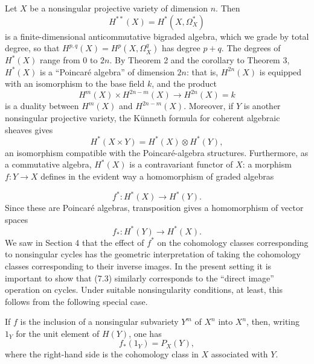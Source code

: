 
Let $X$ be a nonsingular projective variety of dimension $n$. Then
\[
  H^{**}(X)=H^{*}(X,\Omega_X^{*})
\]
is a finite-dimensional anticommutative bigraded algebra, which we grade by
total degree, so that $H^{p,q}(X)=H^{p}(X,\Omega_X^{q})$ has degree $p+q$. The
degrees of $H^{*}(X)$ range from $0$ to $2n$. By Theorem 2 and the corollary to
Theorem 3, $H^{*}(X)$ is a ``Poincaré algebra'' of dimension $2n$: that is,
$H^{2n}(X)$ is equipped with an isomorphism to the base field $k$, and the
product
\[
  H^{m}(X)\times H^{2n-m}(X)\longrightarrow H^{2n}(X)=k
\]
is a duality between $H^{m}(X)$ and $H^{2n-m}(X)$. Moreover, if $Y$ is another
nonsingular projective variety, the Künneth formula for coherent algebraic
sheaves gives
\begin{equation}\tag{7.1}
  H^{*}(X\times Y)=H^{*}(X)\otimes H^{*}(Y),
\end{equation}
an isomorphism compatible with the Poincaré-algebra structures. Furthermore,
as a commutative algebra, $H^{*}(X)$ is a contravariant functor of $X$: a
morphism $f:Y\longrightarrow X$ defines in the evident way a homomorphism of
graded algebras

\begin{equation}\tag{7.2}
  f^{*}:H^{*}(X)\longrightarrow H^{*}(Y).
\end{equation}
Since these are Poincaré algebras, transposition gives a homomorphism of vector
spaces
\begin{equation}\tag{7.3}
  f_{*}:H^{*}(Y)\longrightarrow H^{*}(X).
\end{equation}
We saw in Section 4 that the effect of $f^{*}$ on the cohomology classes
corresponding to nonsingular cycles has the geometric interpretation of taking
the cohomology classes corresponding to their inverse images. In the present
setting it is important to show that (7.3) similarly corresponds to the
``direct image'' operation on cycles. Under suitable nonsingularity conditions,
at least, this follows from the following special case.

 If $f$ is the inclusion of a nonsingular subvariety $Y^{m}$
of $X^{n}$ into $X^{n}$, then, writing $1_Y$ for the unit element of $H(Y)$,
one has
\begin{equation}\tag{7.4}
  f_{*}(1_Y)=P_X(Y),
\end{equation}
where the right-hand side is the cohomology class in $X$ associated with $Y$.

